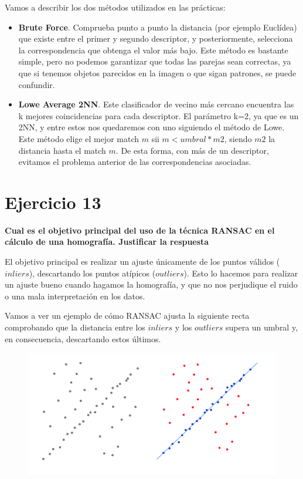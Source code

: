 \documentclass[11pt,a4paper]{article}
\begin{document}
Vamos a describir los dos métodos utilizados en las prácticas:
\begin{itemize}
	\item \textbf{Brute Force}. Comprueba punto a punto la distancia (por ejemplo Euclídea) que existe entre el primer y segundo descriptor, y posteriormente,
		  selecciona la correspondencia que obtenga el valor más bajo. Este método es bastante simple, pero no podemos garantizar que todas las parejas sean
		  correctas, ya que si tenemos objetos parecidos en la imagen o que sigan patrones, se puede confundir.
	\item \textbf{Lowe Average 2NN}. Este clasificador de vecino más cercano encuentra las k mejores coincidencias para cada descriptor. El parámetro k=2, ya
		  que es un 2NN, y entre estos nos quedaremos con uno siguiendo el método de Lowe. Este método elige el mejor match $m$ sii $m < umbral * m2$, siendo $m2$
		  la distancia hasta el match $m$. De esta forma, con más de un descriptor, evitamos el problema anterior de las correspondencias asociadas.
\end{itemize}


\section*{Ejercicio 13}
\textbf{Cual es el objetivo principal del uso de la técnica RANSAC en el cálculo de una homografía. Justificar la respuesta}

El objetivo principal es realizar un ajuste únicamente de los puntos válidos ($inliers$), descartando los puntos atípicos ($outliers$). Esto lo hacemos para
realizar un ajuste bueno cuando hagamos la homografía, y que no nos perjudique el ruido o una mala interpretación en los datos.

Vamos a ver un ejemplo de cómo RANSAC ajusta la siguiente recta comprobando que la distancia entre los $inliers$ y los $outliers$ supera un umbral y, en
consecuencia, descartando estos últimos.
\begin{figure}[H]
\centering
\includegraphics[scale=0.6]{img/ransac.png}
\end{figure}
\end{document}
